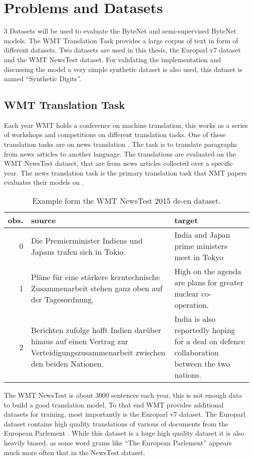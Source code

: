 
\section{Problems and Datasets}

3 Datasets will be used to evaluate the ByteNet and semi-supervised ByteNet models. The WMT Translation Task provides a large corpus of text in form of different datasets. Two datasets are used in this thesis, the Europarl v7 dataset and the WMT NewsTest dataset. For validating the implementation and discussing the model a very simple synthetic dataset is also used, this dataset is named ``Synthetic Digits''.

\subsection{WMT Translation Task}

Each year WMT holds a conference on machine translation, this works as a series of workshops and competitions on different translation tasks. One of these translation tasks are on news translation \cite{wmt16}. The task is to translate paragraphs from news articles to another language. The translations are evaluated on the WMT NewsTest dataset, that are from news articles collected over a specific year. The news translation task is the primary translation task that NMT papers evaluates their models on \cite{bytenet, bahdanau-2015-nmt, sutskever-2014-nmt}.

\begin{table}[H]
\centering
\begin{tabular}{r|p{5cm} p{5cm}}
	obs. & source & target\\ \hline
     0 & Die Premierminister Indiens und Japans trafen sich in Tokio. & India and Japan prime ministers meet in Tokyo \\
     1 & Pläne für eine stärkere kerntechnische Zusammenarbeit stehen ganz oben auf der Tagesordnung. & High on the agenda are plans for greater nuclear co-operation. \\
     2 & Berichten zufolge hofft Indien darüber hinaus auf einen Vertrag zur Verteidigungszusammenarbeit zwischen den beiden Nationen. & India is also reportedly hoping for a deal on defence collaboration between the two nations.
\end{tabular}
\caption{Example form the WMT NewsTest 2015 de-en dataset.}
\end{table}

The WMT NewsTest is about 3000 sentences each year, this is not enough data to build a good translation model. To that end WMT provides additional datasets for training, most importantly is the Europarl v7 dataset. The Europarl dataset contains high quality translations of various of documents from the European Parlement \cite{europarl}. While this dataset is a huge high quality dataset it is also heavily biased, as some word grams like ``The European Parlement'' appears much more often that in the NewsTest dataset.

